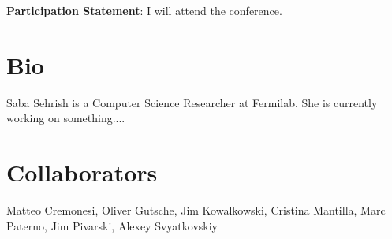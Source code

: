 \documentclass[11pt, twocolumn]{article}
\newcommand{\squeezeup}{\vspace{-5.5mm}}
\begin{document}
\begin{enumerate}
%
%

\end{enumerate}

\textbf{Participation Statement}: I will attend the conference. 

\section{Bio} 
\squeezeup
Saba Sehrish is a Computer Science Researcher 
at Fermilab. She is currently working on something....
\squeezeup
\section{Collaborators} 
\squeezeup
Matteo Cremonesi, Oliver Gutsche, Jim Kowalkowski, 
Cristina Mantilla, Marc Paterno, Jim Pivarski, Alexey Svyatkovskiy
\squeezeup
\scriptsize


\end{document}

